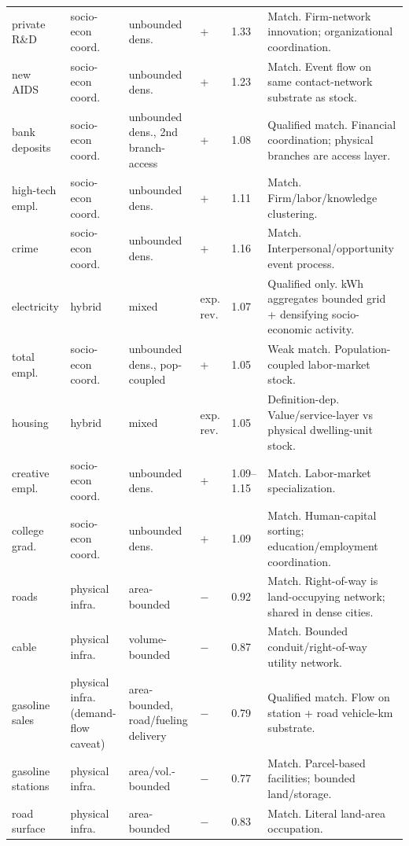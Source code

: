 \begin{table}[h]
\begin{tabular}{p{1.6cm}p{2.2cm}p{2.7cm}>{\centering\arraybackslash}p{1.5cm}p{1.25cm}p{6.75cm}}
private R\&D & socio-econ coord. & unbounded dens. & + & 1.33 & Match. Firm-network innovation; organizational coordination. \\
new AIDS & socio-econ coord. & unbounded dens. & + & 1.23 & Match. Event flow on same contact-network substrate as stock. \\
bank deposits & socio-econ coord. & unbounded dens., 2nd branch-access & + & 1.08 & Qualified match. Financial coordination; physical branches are access layer. \\
high-tech empl. & socio-econ coord. & unbounded dens. & + & 1.11 & Match. Firm/labor/knowledge clustering. \\
crime & socio-econ coord. & unbounded dens. & + & 1.16 & Match. Interpersonal/opportunity event process. \\
electricity & hybrid & mixed & exp. rev. & 1.07 & Qualified only. kWh aggregates bounded grid + densifying socio-economic activity. \\
total empl. & socio-econ coord. & unbounded dens., pop-coupled & + & 1.05 & Weak match. Population-coupled labor-market stock. \\
housing & hybrid & mixed & exp. rev. & 1.05 & Definition-dep. Value/service-layer vs physical dwelling-unit stock. \\
creative empl. & socio-econ coord. & unbounded dens. & + & 1.09--1.15 & Match. Labor-market specialization. \\
college grad. & socio-econ coord. & unbounded dens. & + & 1.09 & Match. Human-capital sorting; education/employment coordination. \\
roads & physical infra. & area-bounded & \(-\) & 0.92 & Match. Right-of-way is land-occupying network; shared in dense cities. \\
cable & physical infra. & volume-bounded & \(-\) & 0.87 & Match. Bounded conduit/right-of-way utility network. \\
gasoline sales & physical infra. (demand-flow caveat) & area-bounded, road/fueling delivery & \(-\) & 0.79 & Qualified match. Flow on station + road vehicle-km substrate. \\
gasoline stations & physical infra. & area/vol.-bounded & \(-\) & 0.77 & Match. Parcel-based facilities; bounded land/storage. \\
road surface & physical infra. & area-bounded & \(-\) & 0.83 & Match. Literal land-area occupation. \\
\bottomrule
\end{tabular}
\renewcommand{\arraystretch}{1.0}
\end{table}

